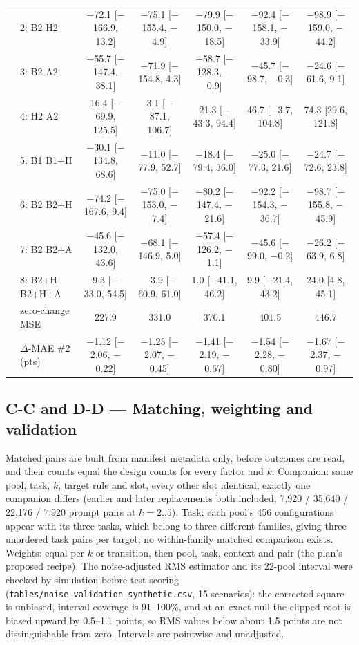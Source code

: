 \begin{table}[h]
{\begin{tabular}{llccccc}
 & 2: B2 \cto{} H2 & $-$72.1 [$-$166.9, 13.2] & $-$75.1 [$-$155.4, $-$4.9] & $-$79.9 [$-$150.0, $-$18.5] & $-$92.4 [$-$158.1, $-$33.9] & $-$98.9 [$-$159.0, $-$44.2] \\
 & 3: B2 \cto{} A2 & $-$55.7 [$-$147.4, 38.1] & $-$71.9 [$-$154.8, 4.3] & $-$58.7 [$-$128.3, $-$0.9] & $-$45.7 [$-$98.7, $-$0.3] & $-$24.6 [$-$61.6, 9.1] \\
 & 4: H2 \cto{} A2 & 16.4 [$-$69.9, 125.5] & 3.1 [$-$87.1, 106.7] & 21.3 [$-$43.3, 94.4] & 46.7 [$-$3.7, 104.8] & 74.3 [29.6, 121.8] \\
 & 5: B1 \cto{} B1+H & $-$30.1 [$-$134.8, 68.6] & $-$11.0 [$-$77.9, 52.7] & $-$18.4 [$-$79.4, 36.0] & $-$25.0 [$-$77.3, 21.6] & $-$24.7 [$-$72.6, 23.8] \\
 & 6: B2 \cto{} B2+H & $-$74.2 [$-$167.6, 9.4] & $-$75.0 [$-$153.0, $-$7.4] & $-$80.2 [$-$147.4, $-$21.6] & $-$92.2 [$-$154.3, $-$36.7] & $-$98.7 [$-$155.8, $-$45.9] \\
 & 7: B2 \cto{} B2+A & $-$45.6 [$-$132.0, 43.6] & $-$68.1 [$-$146.9, 5.0] & $-$57.4 [$-$126.2, $-$1.1] & $-$45.6 [$-$99.0, $-$0.2] & $-$26.2 [$-$63.9, 6.8] \\
 & 8: B2+H \cto{} B2+H+A & 9.3 [$-$33.0, 54.5] & $-$3.9 [$-$60.9, 61.0] & 1.0 [$-$41.1, 46.2] & 9.9 [$-$21.4, 43.2] & 24.0 [4.8, 45.1] \\
 & zero-change MSE & 227.9 & 331.0 & 370.1 & 401.5 & 446.7 \\
 & $\Delta$-MAE \#2 (pts) & $-$1.12 [$-$2.06, $-$0.22] & $-$1.25 [$-$2.07, $-$0.45] & $-$1.41 [$-$2.19, $-$0.67] & $-$1.54 [$-$2.28, $-$0.80] & $-$1.67 [$-$2.37, $-$0.97] \\
\bottomrule
\end{tabular}
}
\end{table}

\subsection*{C-C and D-D --- Matching, weighting and validation}
Matched pairs are built from manifest metadata only, before outcomes are read, and their counts equal the design counts for every factor and $k$. Companion: same pool, task, $k$, target rule and slot, every other slot identical, exactly one companion differs (earlier and later replacements both included; 7,920 / 35,640 / 22,176 / 7,920 prompt pairs at $k=2..5$). Task: each pool's 456 configurations appear with its three tasks, which belong to three different families, giving three unordered task pairs per target; no within-family matched comparison exists. Weights: equal per $k$ or transition, then pool, task, context and pair (the plan's proposed recipe). The noise-adjusted RMS estimator and its 22-pool interval were checked by simulation before test scoring (\texttt{tables/noise\_validation\_synthetic.csv}, 15 scenarios): the corrected square is unbiased, interval coverage is 91--100\%, and at an exact null the clipped root is biased upward by 0.5--1.1 points, so RMS values below about 1.5 points are not distinguishable from zero. Intervals are pointwise and unadjusted.

